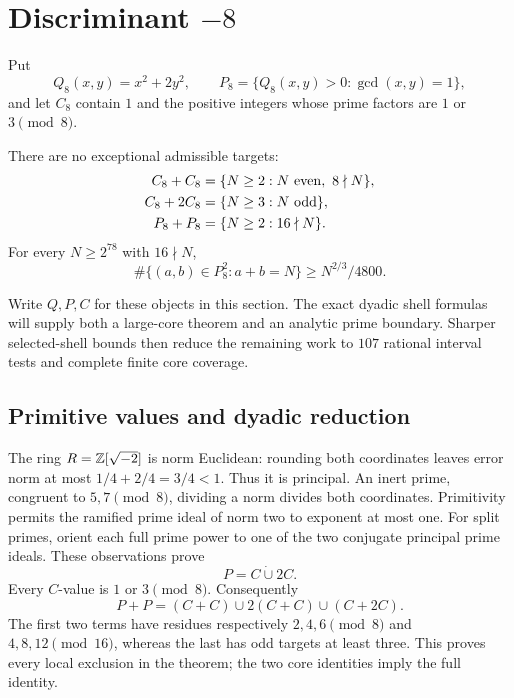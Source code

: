 \section{Discriminant \texorpdfstring{\(-8\)}{-8}}\label{sec:minus8}

Put
\[
 Q_8(x,y)=x^2+2y^2,\qquad
 P_8=\{Q_8(x,y)>0:\gcd(x,y)=1\},
\]
and let \(C_8\) contain \(1\) and the positive integers whose prime
factors are \(1\) or \(3\pmod8\).

\begin{theorem}\label{thm:minus8-exact}
There are no exceptional admissible targets:
\[
\begin{aligned}
 C_8+C_8&=\{N\ge2:N\ {\rm even},\ 8\nmid N\},\\
 C_8+2C_8&=\{N\ge3:N\ {\rm odd}\},\\
 P_8+P_8&=\{N\ge2:16\nmid N\}.
\end{aligned}
\]
For every \(N\ge2^{78}\) with \(16\nmid N\),
\[
              \#\{(a,b)\in P_8^2:a+b=N\}
                       \ge N^{2/3}/4800 .
\]
\end{theorem}

Write \(Q,P,C\) for these objects in this section.
The exact dyadic shell formulas will supply both a large-core
theorem and an analytic prime boundary. Sharper selected-shell
bounds then reduce the remaining work to \(107\) rational interval
tests and complete finite core coverage.

\subsection{Primitive values and dyadic reduction}

The ring \(R=\mathbb Z[\sqrt{-2}]\) is norm Euclidean:
rounding both coordinates leaves error norm at most
\(1/4+2/4=3/4<1\). Thus it is principal.
An inert prime, congruent to \(5,7\pmod8\), dividing a norm
divides both coordinates. Primitivity permits the ramified
prime ideal of norm two to exponent at most one.
For split primes, orient each full prime power to one of the two
conjugate principal prime ideals. These observations prove
\begin{equation}
                        P=C\mathbin{\dot\cup}2C.               \label{eq:m8-value}
\end{equation}
Every \(C\)-value is \(1\) or \(3\pmod8\). Consequently
\begin{equation}
                   P+P=(C+C)\cup2(C+C)\cup(C+2C).              \label{eq:m8-union}
\end{equation}
The first two terms have residues respectively \(2,4,6\pmod8\)
and \(4,8,12\pmod {16}\), whereas the last has odd targets
at least three. This proves every local exclusion in the theorem;
the two core identities imply the full identity.

